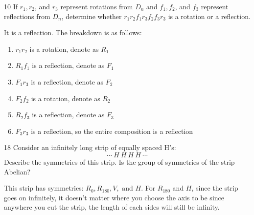 \begin{hwproblem}
{10}{
    If $r_1, r_2$, and $r_3$ represent rotations from $D_n$ and $f_1, f_2$, and $f_3$ represent reflections from $D_n$, determine whether $r_1 r_2 f_1 r_3 f_2 f_3 r_3$ is a rotation or a reflection.
}

It is a reflection. The breakdown is as follows:
\begin{enumerate}
    \item \(r_1 r_2\) is a rotation, denote as \(R_1\)
    \item \(R_1 f_1\) is a reflection, denote as \(F_1\)
    \item \(F_1 r_3\) is a reflection, denote as \(F_2\)
    \item \(F_2 f_2\) is a rotation, denote as \(R_2\)
    \item \(R_2 f_3\) is a reflection, denote as \(F_3\)
    \item \(F_3 r_3\) is a reflection, so the entire composition is a reflection
\end{enumerate}
\end{hwproblem}

\begin{hwproblem}
{18}{
    Consider an infinitely long strip of equally spaced H's:
    $$\cdots\ H\ H\ H\ H\ \cdots$$
    Describe the symmetries of this strip. Is the group of symmetries of the strip Abelian?
}

This strip has symmetries: \(R_0, R_{180}, V, \text{ and } H\). For \(R_{180}\) and \(H\), since the strip goes on infinitely, it doesn't matter where you choose the axis to be since anywhere you cut the strip, the length of each sides will still be infinity.
\end{hwproblem}
